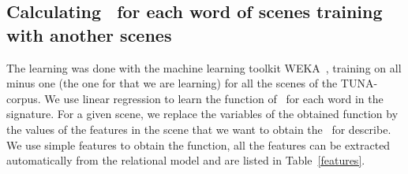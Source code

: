 \subsection{Calculating \puse\ for each word of scenes training with another scenes} \label{subsec:learning}

The learning was done with the machine learning toolkit WEKA~\cite{Hall:WEK09}, training on all minus one (the one for that we are learning) for all the scenes of the TUNA-corpus. We use linear regression to learn the function of \puse\ for each word in the signature. 
For a given scene, we replace the variables of the obtained function by the values of the features in the scene that we want to obtain the \puse\ for describe. 
We use simple features to obtain the function, all the features can be extracted automatically from the relational model and are listed 
in Table~\ref{features}.  

